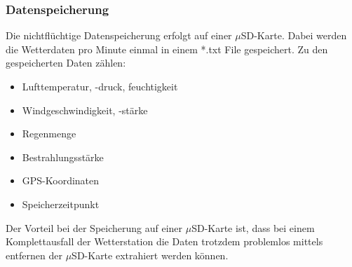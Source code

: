 \subsubsection{Datenspeicherung}
Die nichtflüchtige Datenspeicherung erfolgt auf einer $\mu$SD-Karte. Dabei werden die Wetterdaten pro Minute einmal in einem *.txt File gespeichert. Zu den gespeicherten Daten zählen:
\begin{itemize}
	\item Lufttemperatur, -druck, feuchtigkeit
	\item Windgeschwindigkeit, -stärke
	\item Regenmenge
	\item Bestrahlungsstärke
	\item GPS-Koordinaten
	\item Speicherzeitpunkt
\end{itemize}
Der Vorteil bei der Speicherung auf einer $\mu$SD-Karte ist, dass bei einem Komplettausfall der Wetterstation die Daten trotzdem problemlos mittels entfernen der $\mu$SD-Karte extrahiert werden können.\\
